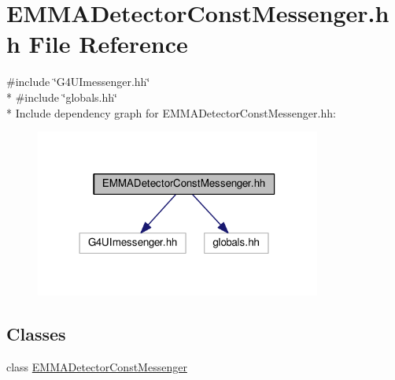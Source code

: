 \hypertarget{EMMADetectorConstMessenger_8hh}{}\section{E\+M\+M\+A\+Detector\+Const\+Messenger.\+hh File Reference}
\label{EMMADetectorConstMessenger_8hh}
{\ttfamily \#include \char`\"{}G4\+U\+Imessenger.\+hh\char`\"{}}\\*
{\ttfamily \#include \char`\"{}globals.\+hh\char`\"{}}\\*
Include dependency graph for E\+M\+M\+A\+Detector\+Const\+Messenger.\+hh\+:
\nopagebreak
\begin{figure}[H]
\begin{center}
\leavevmode
\includegraphics[width=266pt]{EMMADetectorConstMessenger_8hh__incl}
\end{center}
\end{figure}
\subsection*{Classes}
\begin{DoxyCompactItemize}
\item 
class \hyperlink{classEMMADetectorConstMessenger}{E\+M\+M\+A\+Detector\+Const\+Messenger}
\end{DoxyCompactItemize}
